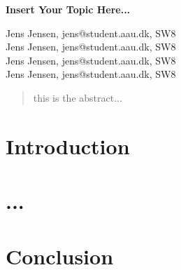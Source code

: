 \documentclass[12pt,a4paper]{article}
\begin{document}
\begin{center}
\bigskip\bigskip
{\Large\bf Insert Your Topic Here...}
\bigskip\bigskip


Jens Jensen, jens@student.aau.dk, SW8\\
Jens Jensen, jens@student.aau.dk, SW8\\
Jens Jensen, jens@student.aau.dk, SW8\\
Jens Jensen, jens@student.aau.dk, SW8

\bigskip
\begin{abstract}
this is the abstract...
\end{abstract}

\thispagestyle{empty}
\end{center}


\titlepage



\thispagestyle{plain}


\section{Introduction}

\section{...}



\section{Conclusion}




\end{document}
